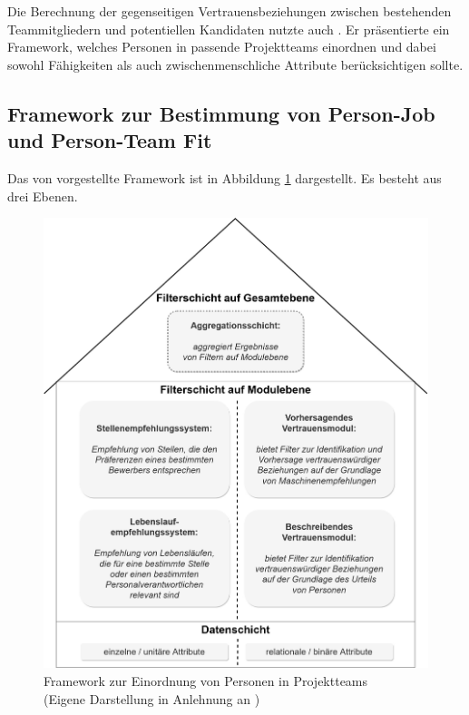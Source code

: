 Die Berechnung der gegenseitigen Vertrauensbeziehungen zwischen bestehenden Teammitgliedern und potentiellen Kandidaten nutzte auch \textcite[S. 1ff.]{keim:2007}. Er präsentierte ein Framework, welches Personen in passende Projektteams einordnen und dabei sowohl Fähigkeiten als auch zwischenmenschliche Attribute berücksichtigen sollte.

\subsection{Framework zur Bestimmung von Person-Job und Person-Team Fit}
\label{ch:verwandteArbeiten:aufDemPEFitBasierendeBilateraleSysteme:pjUndPtFit}
Das von \textcite[S. 1ff.]{keim:2007} vorgestellte Framework ist in Abbildung \ref{fig:verwandteArbeiten:abb3} dargestellt. Es besteht aus drei Ebenen.

\begin{figure}[h]
	\centering
	\includegraphics[width=1\textwidth]{gfx/keim-multilayer.jpg}
	\caption[Framework zur Einordnung von Personen in Projektteams]{Framework zur Einordnung von Personen in Projektteams\\
	(Eigene Darstellung in Anlehnung an \cite[S. 5]{keim:2007})}
	\label{fig:verwandteArbeiten:abb3}
\end{figure}


